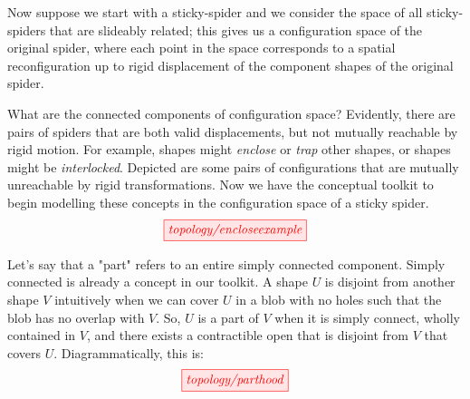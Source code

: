 Now suppose we start with a sticky-spider and we consider the space of all sticky-spiders that are slideably related; this gives us a configuration space of the original spider, where each point in the space corresponds to a spatial reconfiguration up to rigid displacement of the component shapes of the original spider.



\begin{myboxR}
\begin{example}
What are the connected components of configuration space? Evidently, there are pairs of spiders that are both valid displacements, but not mutually reachable by rigid motion. For example, shapes might \emph{enclose} or \emph{trap} other shapes, or shapes might be \emph{interlocked}. Depicted are some pairs of configurations that are mutually unreachable by rigid transformations. Now we have the conceptual toolkit to begin modelling these concepts in the configuration space of a sticky spider.
\[\tikzfig{topology/encloseexample}\]
\end{example}
\end{myboxR}


\begin{myboxB}
\begin{defn}[Parthood]\label{defn:parthood}
Let's say that a "part" refers to an entire simply connected component. Simply connected is already a concept in our toolkit. A shape $U$ is disjoint from another shape $V$ intuitively when we can cover $U$ in a blob with no holes such that the blob has no overlap with $V$. So, $U$ is a part of $V$ when it is simply connect, wholly contained in $V$, and there exists a contractible open that is disjoint from $V$ that covers $U$. Diagrammatically, this is:
\[\tikzfig{topology/parthood}\]
\end{defn}

\end{myboxB}